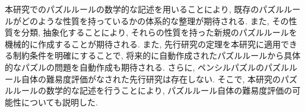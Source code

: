 本研究でのパズルルールの数学的な記述を用いることにより, 既存のパズルルールがどのような性質を持っているかの体系的な整理が期待される. また, その性質を分類, 抽象化することにより, それらの性質を持った新規のパズルルールを機械的に作成することが期待される. また, 先行研究の定理を本研究に適用できる制約条件を明確にすることで, 将来的に自動作成されたパズルルールから具体的なパズルの問題を自動作成も期待される. さらに, ペンシルパズルのパズルルール自体の難易度評価がなされた先行研究は存在しない. そこで, 本研究のパズルルールの数学的な記述を行うことにより, パズルルール自体の難易度評価の可能性についても説明した.